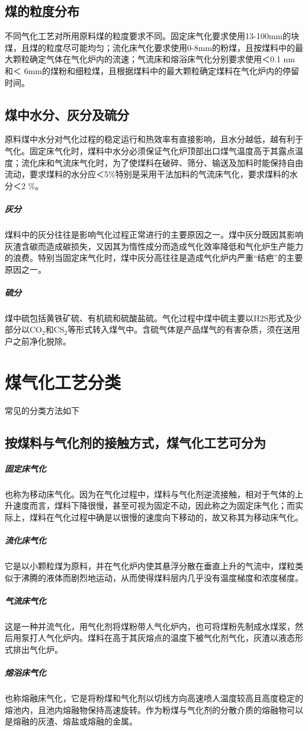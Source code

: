 \documentclass[10pt,openany]{ctexbook}
\begin{document}
\subsection{煤的粒度分布}
不同气化工艺对所用原料煤的粒度要求不同。固定床气化要求使用13-100mm的块煤，且煤的粒度尽可能均匀；流化床气化要求使用0-8mm的粉煤，且按煤料中的最大颗粒确定气体在气化炉内的流速；气流床和熔浴床气化分别要求使用＜0.1 nm 和＜ 6mm的煤粉和细粒煤，且根据煤料中的最大颗粒确定煤料在气化炉内的停留时间。
\subsection{煤中水分、灰分及硫分}
原料煤中水分对气化过程的稳定运行和热效率有直接影响，且水分越低，越有利于气化。固定床气化时，煤料中水分必须保证气化炉顶部出口煤气温度高于其露点温度；流化床和气流床气化时，为了使煤料在破碎、筛分、输送及加料时能保持自由流动，要求煤料的水分应＜5\%特别是采用干法加料的气流床气化，要求煤料的水分＜2 \%。
\subparagraph{灰分}
煤料中的灰分往往是影响气化过程正常进行的主要原因之一。煤中灰分既因其影响灰渣含碳而造成碳损失，又因其为惰性成分而造成气化效率降低和气化炉生产能力的浪费。特别当固定床气化时，煤中灰分高往往是造成气化炉内严重“结疤”的主要原因之一。
\subparagraph{硫分} 煤中硫包括黄铁矿硫、有机硫和硫酸盐硫。气化过程中煤中硫主要以H2S形式及少部分以CO$_2$和CS$_2$等形式转入煤气中。含硫气体是产品煤气的有害杂质，须在送用户之前净化脱除。
\section{煤气化工艺分类}  常见的分类方法如下
\subsection{按煤料与气化剂的接触方式，煤气化工艺可分为}
\subparagraph{固定床气化} 也称为移动床气化。因为在气化过程中，煤料与气化剂逆流接触，相对于气体的上升速度而言，煤料下降很慢，甚至可视为固定不动，因此称之为固定床气化；而实际上，煤料在气化过程中确是以很慢的速度向下移动的，故又称其为移动床气化。
\subparagraph{流化床气化} 它是以小颗粒煤为原料，并在气化炉内使其悬浮分散在垂直上升的气流中，煤粒类似于沸腾的液体而剧烈地运动，从而使得煤料层内几乎没有温度梯度和浓度梯度。
 \subparagraph{气流床气化}
这是一种并流气化，用气化剂将煤粉带人气化炉内，也可将煤粉先制成水煤浆，然后用泵打人气化炉内。煤料在高于其灰熔点的温度下被气化剂气化，灰渣以液态形式排出气化炉。
\subparagraph{熔浴床气化} 也称熔融床气化，它是将粉煤和气化剂以切线方向高速喷人温度较高且高度稳定的熔池内，且池内熔融物保持高速旋转。作为粉煤与气化剂的分散介质的熔融物可以是熔融的灰渣、熔盐或熔融的金属。
\end{document}
